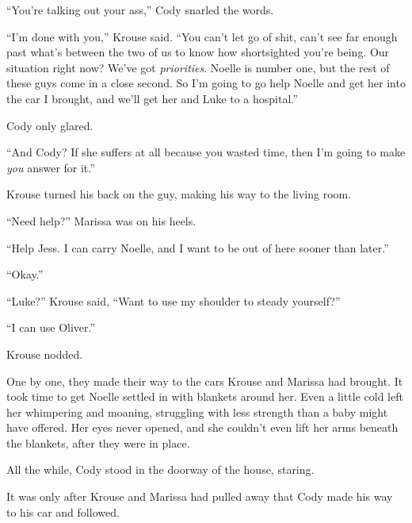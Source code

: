 ``You're talking out your ass,'' Cody snarled the words.



``I'm done with you,'' Krouse said.  ``You can't let go of shit, can't see far enough past what's between the two of us to know how shortsighted you're being.  Our situation right now?  We've got \emph{priorities}.  Noelle is number one, but the rest of these guys come in a close second.  So I'm going to go help Noelle and get her into the car I brought, and we'll get her and Luke to a hospital.''



Cody only glared.



``And Cody?  If she suffers at all because you wasted time, then I'm going to make \emph{you} answer for it.''



Krouse turned his back on the guy, making his way to the living room.



``Need help?''  Marissa was on his heels.



``Help Jess.  I can carry Noelle, and I want to be out of here sooner than later.''



``Okay.''



``Luke?'' Krouse said, ``Want to use my shoulder to steady yourself?''



``I can use Oliver.''



Krouse nodded.



One by one, they made their way to the cars Krouse and Marissa had brought.  It took time to get Noelle settled in with blankets around her.  Even a little cold left her whimpering and moaning, struggling with less strength than a baby might have offered.  Her eyes never opened, and she couldn't even lift her arms beneath the blankets, after they were in place.



All the while, Cody stood in the doorway of the house, staring.



It was only after Krouse and Marissa had pulled away that Cody made his way to his car and followed.



\sectionbreak



